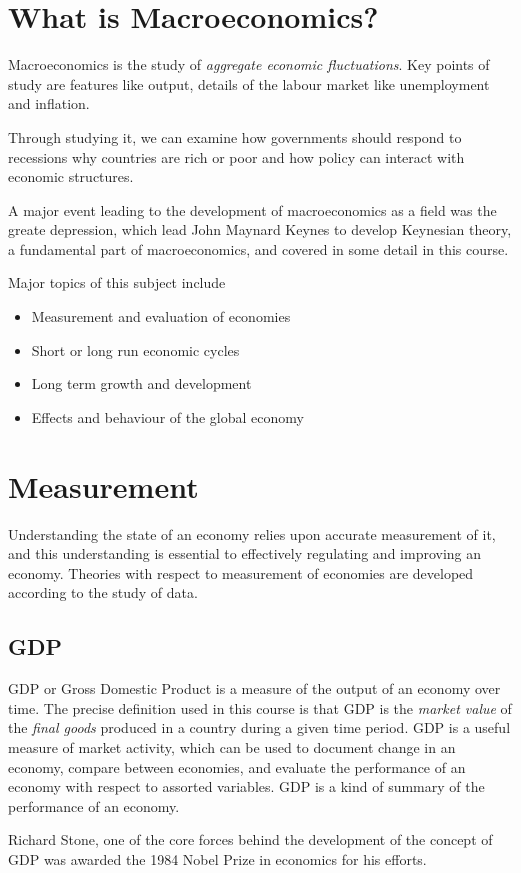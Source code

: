 \documentclass[12pt]{report}
\begin{document}
\begin{flushleft}
    
\section*{What is Macroeconomics?}
Macroeconomics is the study of \textit{aggregate economic fluctuations}. Key
points of study are features like output, details of the labour market like 
unemployment and inflation. \par
Through studying it, we can examine how governments should respond to 
recessions why countries are rich or poor and how policy can interact with 
economic structures. \par
A major event leading to the development of macroeconomics as a field was the
greate depression, which lead John Maynard Keynes to develop Keynesian theory,
a fundamental part of macroeconomics, and covered in some detail in this 
course.

\bigskip
Major topics of this subject include
\begin{itemize}
    \item Measurement and evaluation of economies
    \item Short or long run economic cycles
    \item Long term growth and development
    \item Effects and behaviour of the global economy
\end{itemize}

\section*{Measurement}
Understanding the state of an economy relies upon accurate measurement of it,
and this understanding is essential to effectively regulating and improving an
economy. Theories with respect to measurement of economies are developed 
according to the study of data.

\subsection*{GDP}
GDP or Gross Domestic Product is a measure of the output of an economy over 
time. The precise definition used in this course is that GDP is the 
\textit{market value} of the \textit{final goods} produced in a country 
during a given time period. GDP is a useful measure of market activity, which
can be used to document change in an economy, compare between economies, and
evaluate the performance of an economy with respect to assorted variables. GDP
is a kind of summary of the performance of an economy. \par
Richard Stone, one of the core forces behind the development of the concept of
GDP was awarded the 1984 Nobel Prize in economics for his efforts.


\end{flushleft}
\end{document}
